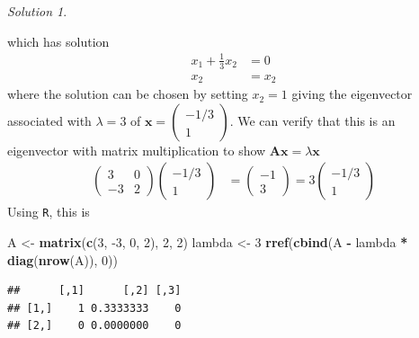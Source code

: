 \documentclass[
]{book}
\newenvironment{Shaded}{\begin{snugshade}}{\end{snugshade}}
\newcommand{\DecValTok}[1]{\textcolor[rgb]{0.00,0.00,0.81}{#1}}
\newcommand{\KeywordTok}[1]{\textcolor[rgb]{0.13,0.29,0.53}{\textbf{#1}}}
\newcommand{\NormalTok}[1]{#1}
\newcommand{\OperatorTok}[1]{\textcolor[rgb]{0.81,0.36,0.00}{\textbf{#1}}}
\newcommand{\StringTok}[1]{\textcolor[rgb]{0.31,0.60,0.02}{#1}}
\theoremstyle{definition}
\theoremstyle{definition}
\theoremstyle{definition}
\theoremstyle{definition}
\theoremstyle{remark}
\newtheorem*{solution}{Solution}
\begin{document}
\begin{solution}
\begin{enumerate}
\[  \]
  which has solution
  \[
  \begin{aligned}
  x_1  + \frac{1}{3} x_2 & = 0 \\
  x_2  & = x_2
  \end{aligned}
  \]
  where the solution can be chosen by setting \(x_2 = 1\) giving the eigenvector associated with \(\lambda = 3\) of \(\mathbf{x} = \begin{pmatrix} -1/3 \\ 1 \end{pmatrix}\). We can verify that this is an eigenvector with matrix multiplication to show \(\mathbf{A} \mathbf{x} = \lambda \mathbf{x}\)
  \[
  \begin{aligned}
  \begin{pmatrix} 3 & 0 \\ -3 & 2 \end{pmatrix} \begin{pmatrix} -1/3 \\ 1 \end{pmatrix} & = \begin{pmatrix} -1 \\ 3 \end{pmatrix}  = 3 \begin{pmatrix} -1/3 \\ 1 \end{pmatrix}
  \end{aligned}
  \]
  Using \texttt{R}, this is
\end{enumerate}

\begin{Shaded}
\begin{Highlighting}[]
\NormalTok{A <-}\StringTok{  }\KeywordTok{matrix}\NormalTok{(}\KeywordTok{c}\NormalTok{(}\DecValTok{3}\NormalTok{, }\DecValTok{-3}\NormalTok{, }\DecValTok{0}\NormalTok{, }\DecValTok{2}\NormalTok{), }\DecValTok{2}\NormalTok{, }\DecValTok{2}\NormalTok{)}
\NormalTok{lambda <-}\StringTok{ }\DecValTok{3}
\KeywordTok{rref}\NormalTok{(}\KeywordTok{cbind}\NormalTok{(A }\OperatorTok{-}\StringTok{ }\NormalTok{lambda }\OperatorTok{*}\StringTok{ }\KeywordTok{diag}\NormalTok{(}\KeywordTok{nrow}\NormalTok{(A)), }\DecValTok{0}\NormalTok{))}
\end{Highlighting}
\end{Shaded}

\begin{verbatim}
##      [,1]      [,2] [,3]
## [1,]    1 0.3333333    0
## [2,]    0 0.0000000    0
\end{verbatim}


\end{solution}
\end{document}

